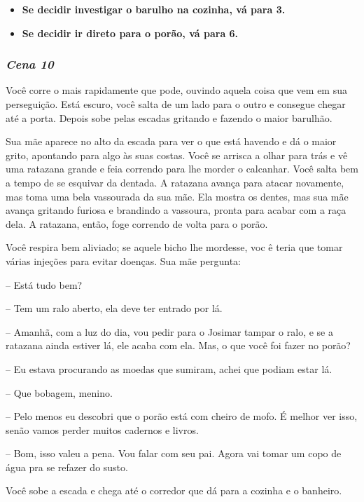 \begin{itemize}
	\item \textbf{Se decidir investigar o barulho na cozinha, vá para 3.}
	\item \textbf{Se decidir ir direto para o porão, vá para 6.}
\end{itemize}

\bigskip\medskip

\subsubsection{\textit{\textbf{Cena 10}}}
Você corre o mais rapidamente que pode, ouvindo aquela coisa que vem em sua perseguição. Está escuro, você salta de um lado para o outro e consegue chegar até a porta. Depois sobe pelas escadas gritando e fazendo o maior barulhão.

Sua mãe aparece no alto da escada para ver o que está havendo e dá o maior grito, apontando para algo às suas costas. Você se arrisca a olhar para trás e vê uma ratazana grande e feia correndo para lhe morder o calcanhar. Você salta bem a tempo de se esquivar da dentada. A ratazana avança para atacar novamente, mas toma uma bela vassourada da sua mãe. Ela mostra os dentes, mas sua mãe avança gritando furiosa e brandindo a vassoura, pronta para acabar com a raça dela. A ratazana, então, foge correndo de volta para o porão.

Você respira bem aliviado; se aquele bicho lhe mordesse, voc ê teria que tomar várias injeções para evitar doenças. Sua mãe pergunta:

-- Está tudo bem?

-- Tem um ralo aberto, ela deve ter entrado por lá.

-- Amanhã, com a luz do dia, vou pedir para o Josimar tampar o ralo, e se a ratazana ainda estiver lá, ele acaba com ela. Mas, o que você foi fazer no porão?

-- Eu estava procurando as moedas que sumiram, achei que podiam estar lá.

-- Que bobagem, menino.

-- Pelo menos eu descobri que o porão está com cheiro de mofo. É melhor ver isso, senão vamos perder muitos cadernos e livros.

-- Bom, isso valeu a pena. Vou falar com seu pai. Agora vai tomar um copo de água pra se refazer do susto.

Você sobe a escada e chega até o corredor que dá para a cozinha e o banheiro.

